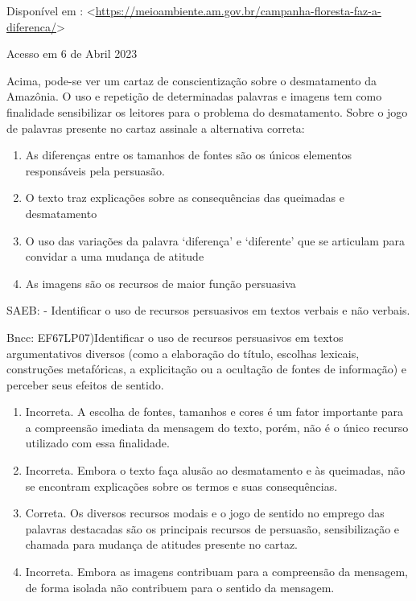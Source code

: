 {{\begin{itemize}
\begin{itemize}
Disponível em :
\textless{}\href{https://meioambiente.am.gov.br/campanha-floresta-faz-a-diferenca/}{\uline{https://meioambiente.am.gov.br/campanha-floresta-faz-a-diferenca/}}\textgreater{}

Acesso em 6 de Abril 2023

Acima, pode-se ver um cartaz de conscientização sobre o desmatamento da
Amazônia. O uso e repetição de determinadas palavras e imagens tem como
finalidade sensibilizar os leitores para o problema do desmatamento.
Sobre o jogo de palavras presente no cartaz assinale a alternativa
correta:

\begin{enumerate}
\def\labelenumi{\alph{enumi})}
\item
  As diferenças entre os tamanhos de fontes são os únicos elementos
  responsáveis pela persuasão.
\item
  O texto traz explicações sobre as consequências das queimadas e
  desmatamento
\item
  O uso das variações da palavra `diferença' e `diferente' que se
  articulam para convidar a uma mudança de atitude
\item
  As imagens são os recursos de maior função persuasiva
\end{enumerate}

SAEB: - Identificar o uso de recursos persuasivos em textos verbais e
não verbais.

Bncc: EF67LP07)Identificar o uso de recursos persuasivos em textos
argumentativos diversos (como a elaboração do título, escolhas lexicais,
construções metafóricas, a explicitação ou a ocultação de fontes de
informação) e perceber seus efeitos de sentido.

\begin{enumerate}
\def\labelenumi{\arabic{enumi}.}
\item
  Incorreta. A escolha de fontes, tamanhos e cores é um fator importante
  para a compreensão imediata da mensagem do texto, porém, não é o único
  recurso utilizado com essa finalidade.
\item
  Incorreta. Embora o texto faça alusão ao desmatamento e às queimadas,
  não se encontram explicações sobre os termos e suas consequências.
\item
  Correta. Os diversos recursos modais e o jogo de sentido no emprego
  das palavras destacadas são os principais recursos de persuasão,
  sensibilização e chamada para mudança de atitudes presente no cartaz.
\item
  Incorreta. Embora as imagens contribuam para a compreensão da
  mensagem, de forma isolada não contribuem para o sentido da mensagem.
\end{enumerate}


\end{itemize}
\end{itemize}}}
